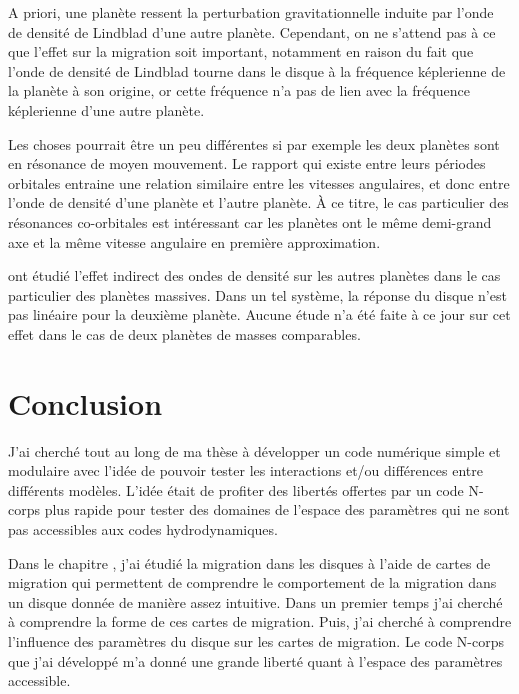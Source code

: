 A priori, une planète ressent la perturbation gravitationnelle induite par l'onde de densité de Lindblad d'une autre planète. Cependant, on ne s'attend pas à ce que l'effet sur la migration soit important, notamment en raison du fait que l'onde de densité de Lindblad tourne dans le disque à la fréquence képlerienne de la planète à son origine, or cette fréquence n'a pas de lien avec la fréquence képlerienne d'une autre planète. 

Les choses pourrait être un peu différentes si par exemple les deux planètes sont en résonance de moyen mouvement. Le rapport qui existe entre leurs périodes orbitales entraine une relation similaire entre les vitesses angulaires, et donc entre l'onde de densité d'une planète et l'autre planète. À ce titre, le cas particulier des résonances co-orbitales est intéressant car les planètes ont le même demi-grand axe et la même vitesse angulaire en première approximation.

\cite{podlewska2012outward, baruteau2013disk} ont étudié l'effet indirect des ondes de densité sur les autres planètes dans le cas particulier des planètes massives. Dans un tel système, la réponse du disque n'est pas linéaire pour la deuxième planète. Aucune étude n'a été faite à ce jour sur cet effet dans le cas de deux planètes de masses comparables. 

\section{Conclusion}
J'ai cherché tout au long de ma thèse à développer un code numérique simple et modulaire avec l'idée de pouvoir tester les interactions et/ou différences entre différents modèles. L'idée était de profiter des libertés offertes par un code N-corps plus rapide pour tester des domaines de l'espace des paramètres qui ne sont pas accessibles aux codes hydrodynamiques. 

\bigskip

Dans le chapitre , j'ai étudié la migration dans les disques à l'aide de cartes de migration qui permettent de comprendre le comportement de la migration dans un disque donnée de manière assez intuitive. Dans un premier temps j'ai cherché à comprendre la forme de ces cartes de migration. Puis, j'ai cherché à comprendre l'influence des paramètres du disque sur les cartes de migration. Le code N-corps que j'ai développé m'a donné une grande liberté quant à l'espace des paramètres accessible. 


